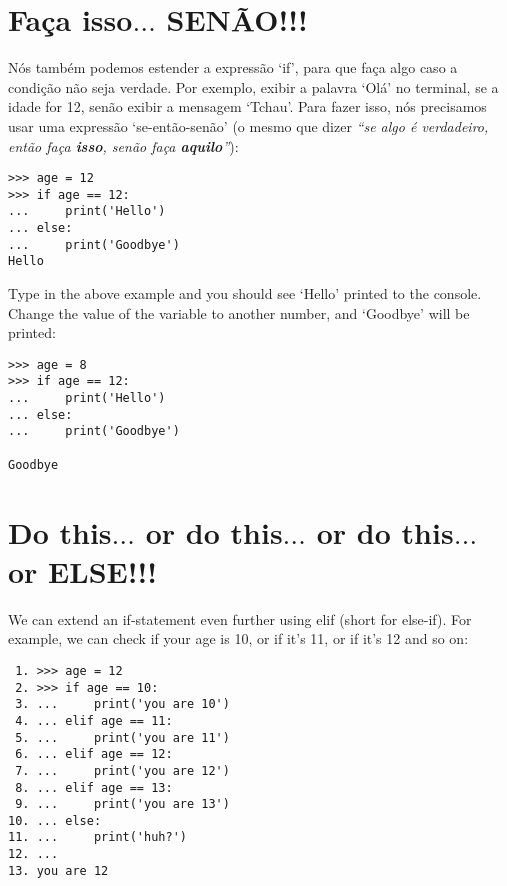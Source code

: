 \section{Faça isso$\ldots$ SENÃO!!!}

Nós também podemos estender a expressão `if', para que faça algo caso a condição não seja verdade. Por exemplo, exibir a palavra `Olá' no terminal, se a idade for 12, senão exibir a mensagem `Tchau'. Para fazer isso, nós precisamos usar uma expressão `se-então-senão' (o mesmo que dizer \emph{``se algo é verdadeiro, então faça \textbf{isso}, senão faça \textbf{aquilo}''}):

\begin{listing}
\begin{verbatim}
>>> age = 12
>>> if age == 12:
...     print('Hello')
... else:
...     print('Goodbye')
Hello
\end{verbatim}
\end{listing}

Type in the above example and you should see `Hello' printed to the console.  Change the value of the variable  to another number, and `Goodbye' will be printed:

\begin{listing}
\begin{verbatim}
>>> age = 8
>>> if age == 12:
...     print('Hello')
... else:
...     print('Goodbye')

Goodbye
\end{verbatim}
\end{listing}

\section{Do this$\ldots$ or do this$\ldots$ or do this$\ldots$ or ELSE!!!}

We can extend an if-statement even further using elif (short for else-if). For example, we can check if your age is 10, or if it's 11, or if it's 12 and so on:

\begin{listing}
\begin{verbatim}
 1. >>> age = 12
 2. >>> if age == 10:
 3. ...     print('you are 10')
 4. ... elif age == 11:
 5. ...     print('you are 11')
 6. ... elif age == 12:
 7. ...     print('you are 12')
 8. ... elif age == 13:
 9. ...     print('you are 13')
10. ... else:
11. ...     print('huh?')
12. ...
13. you are 12
\end{verbatim}
\end{listing}

